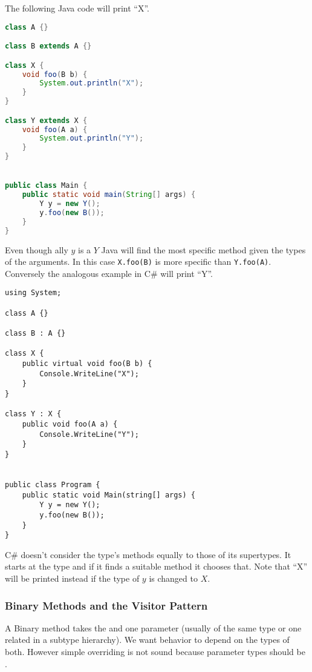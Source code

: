 \documentclass{article}
\begin{document}
\begin{example}
  The following Java code will print ``X''.
\begin{lstlisting}[language=Java, escapechar=|]
class A {}

class B extends A {}

class X {
    void foo(B b) {
        System.out.println("X");
    }
}

class Y extends X {
    void foo(A a) {
        System.out.println("Y");
    }
}


public class Main {
    public static void main(String[] args) {
        Y y = new Y();
        y.foo(new B());
    }
}
\end{lstlisting}
  Even though \static{}ally $y$ is a $Y$ Java will find the most specific method given the \static{} types of the arguments.
  In this case \texttt{X.foo(B)} is more specific than \texttt{Y.foo(A)}.
  Conversely the analogous example in C\# will print ``Y''.
\begin{lstlisting}[language={[Sharp]C}, escapechar=|]
using System;

class A {}

class B : A {}

class X {
    public virtual void foo(B b) {
        Console.WriteLine("X");
    }
}

class Y : X {
    public void foo(A a) {
        Console.WriteLine("Y");
    }
}


public class Program {
    public static void Main(string[] args) {
        Y y = new Y();
        y.foo(new B());
    }
}
\end{lstlisting}
  C\# doesn't consider the \static{} type's methods equally to those of its supertypes.
  It starts at the \static{} type and if it finds a suitable method it chooses that.
  Note that ``X'' will be printed instead if the \static{} type of $y$ is changed to $X$.
\end{example}

\subsubsection{Binary Methods and the Visitor Pattern}

A Binary method takes the \receiver{} and one parameter (usually of the same type or one related in a subtype hierarchy). We want behavior to depend on the \textit{\dynamic{}} types of both. However simple overriding is not sound because parameter types should be \contra{}.
\end{document}
